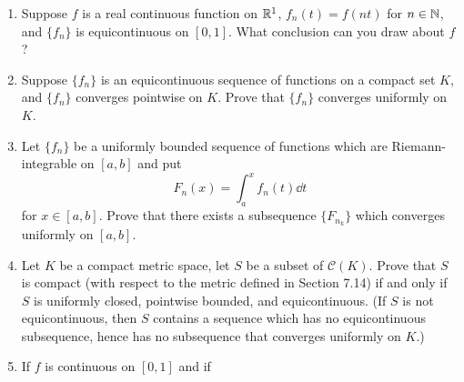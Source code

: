 \documentclass[../psets.tex]{subfiles}
\begin{document}
\begin{enumerate}[label={\textbf{\arabic*.}}]
    \begin{align*}
        x(t) &= \sum_{n=1}^\infty 2^{-n}f(3^{2n-1}t)&
        y(t) &= \sum_{n=1}^\infty 2^{-n}f(3^{2n}t)
    \end{align*}
    Prove that $\Phi$ is continuous and that $\Phi$ maps $I=[0,1]$ onto the unit square $I^2\subset\R^2$. In fact, show that $\Phi$ maps the Cantor set onto $I^2$. (Hint: Each $(x_0,y_0)\in I^2$ has the form
    \begin{align*}
        x_0 &= \sum_{n=1}^\infty 2^{-n}a_{2n-1}&
        y_0 &= \sum_{n=1}^\infty 2^{-n}a_{2n}
    \end{align*}
    where each $a_i$ is 0 or 1. If
    \begin{equation*}
        t_0 = \sum_{i=1}^\infty 3^{-i-1}(2a_i)
    \end{equation*}
    show that $f(3^kt_0)=a_k$, and hence that $x(t_0)=x_0$, $y_0(t_0)=y_0$.) This simple example of a so-called \textbf{space-filling curve} is due to \textcite{bib:Schoenberg}.
    \begin{proof}
        Save for last.
    \end{proof}
    \item Suppose $f$ is a real continuous function on $\mathbb{R}^1$, $f_n(t)=f(nt)$ for $n\in\mathbb{N}$, and $\{f_n\}$ is equicontinuous on $[0,1]$. What conclusion can you draw about $f$?
    \item Suppose $\{f_n\}$ is an equicontinuous sequence of functions on a compact set $K$, and $\{f_n\}$ converges pointwise on $K$. Prove that $\{f_n\}$ converges uniformly on $K$.
    \item Let $\{f_n\}$ be a uniformly bounded sequence of functions which are Riemann-integrable on $[a,b]$ and put
    \begin{equation*}
        F_n(x) = \int_a^xf_n(t)\dd{t}
    \end{equation*}
    for $x\in[a,b]$. Prove that there exists a subsequence $\{F_{n_k}\}$ which converges uniformly on $[a,b]$.
    \item Let $K$ be a compact metric space, let $S$ be a subset of $\mathscr{C}(K)$. Prove that $S$ is compact (with respect to the metric defined in Section 7.14) if and only if $S$ is uniformly closed, pointwise bounded, and equicontinuous. (If $S$ is not equicontinuous, then $S$ contains a sequence which has no equicontinuous subsequence, hence has no subsequence that converges uniformly on $K$.)
    \item If $f$ is continuous on $[0,1]$ and if
    \begin{equation*}

\end{equation*}
\end{enumerate}
\end{document}
